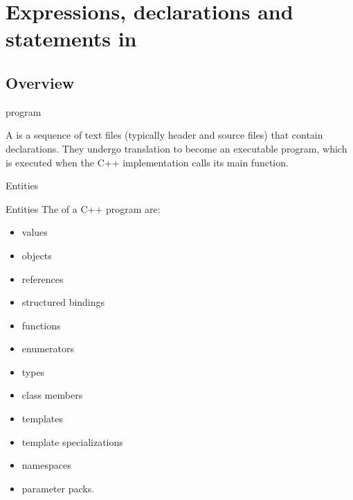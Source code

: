 \section{Expressions, declarations and statements in \CCLang}

\subsection{Overview}

\begin{frame}{\CCLang program}{}
  \begin{definition}
    A  is a sequence of text files (typically header and source files) that contain declarations. They undergo translation to become an executable program, which is executed when the C++ implementation calls its main function.
  \end{definition}
\end{frame}

\begin{frame}{Entities}{}
  \begin{block}{Entities}
    The  of a C++ program are:
    \begin{itemize}
    \item
      values
    \item
      objects
    \item
      references
    \item
      structured bindings
    \item
      functions
    \item
      enumerators
    \item
      types
    \item
      class members
    \item
      templates
    \item
      template specializations
    \item
      namespaces
    \item
      parameter packs.
    \end{itemize}
  \end{block}
\end{frame}


